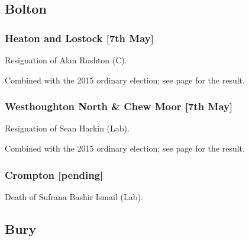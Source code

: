 \documentclass[a4paper,openany]{book}
\begin{document}
\begin{resultsiii}
\section[Greater Manchester]{}

\subsection*{Bolton}

\subsubsection*{Heaton and Lostock \hspace*{\fill}\nolinebreak[1]%
\enspace\hspace*{\fill}
[7th May]}


Resignation of Alan Rushton (C).

Combined with the 2015 ordinary election; see page \pageref{HeatonLostockBolton} for the result.

\subsubsection*{Westhoughton North \& Chew Moor \hspace*{\fill}\nolinebreak[1]%
\enspace\hspace*{\fill}
[7th May]}


Resignation of Sean Harkin (Lab).

Combined with the 2015 ordinary election; see page \pageref{WesthoughtonNorthChewMoorBolton} for the result.

\subsubsection*{Crompton \hspace*{\fill}\nolinebreak[1]%
\enspace\hspace*{\fill}
[pending]}


Death of Sufrana Bashir Ismail (Lab).

\subsection*{Bury}


\end{resultsiii}
\end{document}
